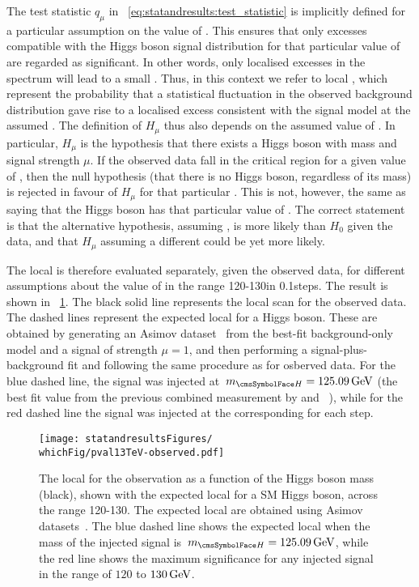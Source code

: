 The test statistic $q_{\mu}$ in \Eq~\ref{eq:statandresults:test_statistic} is implicitly defined for a particular assumption on the value of \mH. This ensures that only excesses compatible with the Higgs boson signal distribution for that particular value of \mH are regarded as significant. In other words, only localised excesses in the \mgg spectrum will lead to a small \pvalue. Thus, in this context we refer to local \pvalue\s, which represent the probability that a statistical fluctuation in the observed background distribution gave rise to a localised excess consistent with the signal model at the assumed \mH. The definition of $H_{\mu}$ thus also depends on the assumed value of \mH. In particular, $H_{\mu}$ is the hypothesis that there exists a Higgs boson with mass \mH and signal strength $\mu$. If the observed data fall in the critical region for a given value of \mH, then the null hypothesis (that there is no Higgs boson, regardless of its mass) is rejected in favour of $H_{\mu}$ for that particular \mH. This is not, however, the same as saying that the Higgs boson has that particular value of \mH. The correct statement is that the alternative hypothesis, assuming \mH, is more likely than $H_{0}$ given the data, and that $H_{\mu}$ assuming a different \mH could be yet more likely.

The local \pvalue is therefore evaluated separately, given the observed data, for different assumptions about the value of \mH in the range 120-130\GeV in 0.1\GeV steps. The result is shown in \Fig~\ref{fig:statandresults:pval}. The black solid line represents the local \pvalue scan for the observed data. The dashed lines represent the expected local \pvalue\s for a \SM Higgs boson. These are obtained by generating an Asimov dataset~\cite{Cowan:2010js} from the best-fit background-only model and a signal of strength $\mu=1$, and then performing a signal-plus-background fit and following the same procedure as for osberved data. For the blue dashed line, the signal was injected at $\mH=125.09\GeV$ (the best fit value from the previous combined \RunI measurement by \CMS and \ATLAS~\cite{PhysRevLett.114.191803}), while for the red dashed line the signal was injected at the corresponding \mH for each step. 


\begin{figure}[ht!]
\centering
\texttt{[image: statandresultsFigures/\\whichFig/pval13TeV-observed.pdf]} 
\caption{The local \pvalue for the observation as a function of the Higgs boson mass (black), shown with the expected local \pvalue\s for a SM Higgs boson, across the range 120-130\GeV. The expected local \pvalue\s are obtained using Asimov datasets~\cite{Cowan:2010js}. The blue dashed line shows the expected local \pvalue when the mass of the injected signal is $\mH=125.09\GeV$, while the red line shows the maximum significance for any injected signal in the range of $120$ to $130\,\text{Ge\hspace{-.08em}V}$.}

\label{fig:statandresults:pval}
\end{figure}


